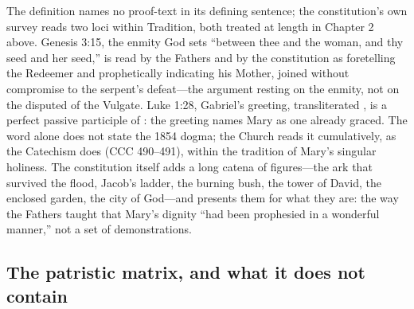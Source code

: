 The definition names no proof-text in its defining sentence; the
constitution's own survey reads two loci within Tradition, both treated
at length in Chapter 2 above. Genesis 3:15, the enmity God sets
``between thee and the woman, and thy seed and her seed,'' is read by the
Fathers and by the constitution as foretelling the Redeemer and
prophetically indicating his Mother, joined without compromise to the
serpent's defeat---the argument resting on the enmity, not on the
disputed  of the Vulgate. Luke 1:28, Gabriel's
greeting, transliterated , is a perfect passive
participle of : the greeting names Mary as one already
graced. The word alone does not state the 1854 dogma; the Church reads it
cumulatively, as the Catechism does (CCC 490--491), within the tradition
of Mary's singular holiness. The constitution itself adds a long catena of figures---the
ark that survived the flood, Jacob's ladder, the burning bush, the tower
of David, the enclosed garden, the city of God---and presents them for
what they are: the way the Fathers taught that Mary's dignity ``had been
prophesied in a wonderful manner,'' not a set of demonstrations.

\subsection*{The patristic matrix, and what it does not contain}

